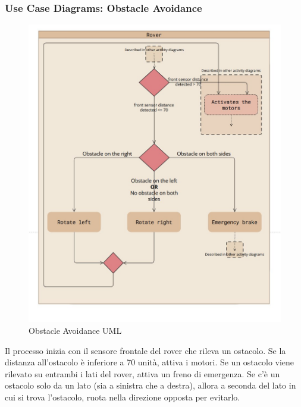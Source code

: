 \documentclass{article}
\begin{document}
      \subsubsection{Use Case Diagrams: Obstacle Avoidance}
        \begin{figure}[h]
          \includegraphics[width=0.7\linewidth]{../Use_Case_Diagram/Obstacle_Avoidance.jpg}
          \centering
          \caption{Obstacle Avoidance UML}
        \end{figure}
        Il processo inizia con il sensore frontale del rover che rileva un ostacolo. Se la distanza all’ostacolo è inferiore a 70 unità, attiva i motori. Se un ostacolo viene rilevato su entrambi i lati del rover, attiva un freno di emergenza. Se c’è un ostacolo solo da un lato (sia a sinistra che a destra), allora a seconda del lato in cui si trova l’ostacolo, ruota nella direzione opposta per evitarlo.
\end{document}
